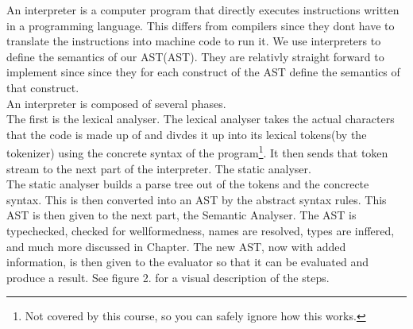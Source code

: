 \documentclass{article}
\begin{document}
            An \gls{interpreter} is a computer program that directly executes instructions written in a programming language.
            This differs from \glspl{compiler} since they dont have to translate the instructions into machine code to run it. 
            We use interpreters to define the semantics of our \gls{AST}(AST). They are relativly straight forward to implement since
            since they for each construct of the AST define the semantics of that construct.\\
            \newline
            An interpreter is composed of several phases. \\
            The first is the lexical analyser. The lexical analyser takes the actual characters that the code is made up of and divdes it up into its lexical tokens(by the tokenizer) using the concrete syntax of the program\footnote{Not covered by this course, so you can safely ignore how this works.}. 
            It then sends that token stream to the next part of the interpreter. The static analyser.\\
            The static analyser builds a parse tree out of the tokens and the concrecte syntax. This is then converted into an AST by the abstract syntax rules. This AST is then given to the next part, the Semantic Analyser.
            The AST is typechecked, checked for wellformedness, names are resolved, types are inffered, and much more discussed in Chapter. The new AST, now with added information, is then given to the evaluator so that it can be evaluated and produce a result.
            See figure 2. for a visual description of the steps.
\end{document}
